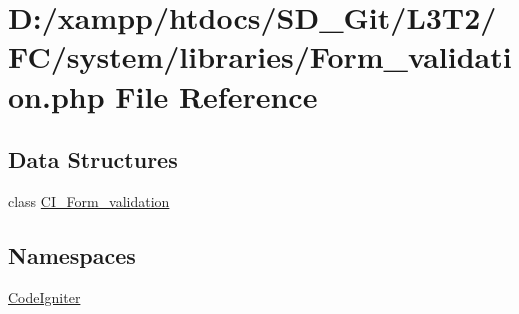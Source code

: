 \hypertarget{system_2libraries_2_form__validation_8php}{}\section{D\+:/xampp/htdocs/\+S\+D\+\_\+\+Git/\+L3\+T2/\+F\+C/system/libraries/\+Form\+\_\+validation.php File Reference}
\label{system_2libraries_2_form__validation_8php}
\subsection*{Data Structures}
\begin{DoxyCompactItemize}
\item 
class \hyperlink{class_c_i___form__validation}{C\+I\+\_\+\+Form\+\_\+validation}
\end{DoxyCompactItemize}
\subsection*{Namespaces}
\begin{DoxyCompactItemize}
\item 
 \hyperlink{namespace_code_igniter}{Code\+Igniter}
\end{DoxyCompactItemize}
